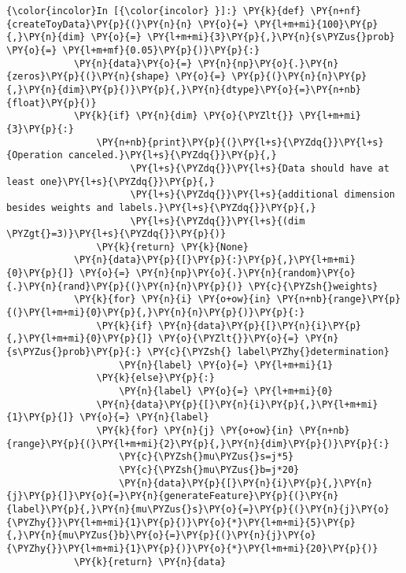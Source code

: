     \begin{Verbatim}[commandchars=\\\{\}]
{\color{incolor}In [{\color{incolor} }]:} \PY{k}{def} \PY{n+nf}{createToyData}\PY{p}{(}\PY{n}{n} \PY{o}{=} \PY{l+m+mi}{100}\PY{p}{,}\PY{n}{dim} \PY{o}{=} \PY{l+m+mi}{3}\PY{p}{,}\PY{n}{s\PYZus{}prob} \PY{o}{=} \PY{l+m+mf}{0.05}\PY{p}{)}\PY{p}{:}
            \PY{n}{data}\PY{o}{=} \PY{n}{np}\PY{o}{.}\PY{n}{zeros}\PY{p}{(}\PY{n}{shape} \PY{o}{=} \PY{p}{(}\PY{n}{n}\PY{p}{,}\PY{n}{dim}\PY{p}{)}\PY{p}{,}\PY{n}{dtype}\PY{o}{=}\PY{n+nb}{float}\PY{p}{)}
            \PY{k}{if} \PY{n}{dim} \PY{o}{\PYZlt{}} \PY{l+m+mi}{3}\PY{p}{:}
                \PY{n+nb}{print}\PY{p}{(}\PY{l+s}{\PYZdq{}}\PY{l+s}{Operation canceled.}\PY{l+s}{\PYZdq{}}\PY{p}{,}
                      \PY{l+s}{\PYZdq{}}\PY{l+s}{Data should have at least one}\PY{l+s}{\PYZdq{}}\PY{p}{,}
                      \PY{l+s}{\PYZdq{}}\PY{l+s}{additional dimension besides weights and labels.}\PY{l+s}{\PYZdq{}}\PY{p}{,}
                      \PY{l+s}{\PYZdq{}}\PY{l+s}{(dim \PYZgt{}=3)}\PY{l+s}{\PYZdq{}}\PY{p}{)}
                \PY{k}{return} \PY{k}{None}
            \PY{n}{data}\PY{p}{[}\PY{p}{:}\PY{p}{,}\PY{l+m+mi}{0}\PY{p}{]} \PY{o}{=} \PY{n}{np}\PY{o}{.}\PY{n}{random}\PY{o}{.}\PY{n}{rand}\PY{p}{(}\PY{n}{n}\PY{p}{)} \PY{c}{\PYZsh{}weights}
            \PY{k}{for} \PY{n}{i} \PY{o+ow}{in} \PY{n+nb}{range}\PY{p}{(}\PY{l+m+mi}{0}\PY{p}{,}\PY{n}{n}\PY{p}{)}\PY{p}{:}
                \PY{k}{if} \PY{n}{data}\PY{p}{[}\PY{n}{i}\PY{p}{,}\PY{l+m+mi}{0}\PY{p}{]} \PY{o}{\PYZlt{}}\PY{o}{=} \PY{n}{s\PYZus{}prob}\PY{p}{:} \PY{c}{\PYZsh{} label\PYZhy{}determination}
                    \PY{n}{label} \PY{o}{=} \PY{l+m+mi}{1}
                \PY{k}{else}\PY{p}{:}
                    \PY{n}{label} \PY{o}{=} \PY{l+m+mi}{0}
                \PY{n}{data}\PY{p}{[}\PY{n}{i}\PY{p}{,}\PY{l+m+mi}{1}\PY{p}{]} \PY{o}{=} \PY{n}{label}
                \PY{k}{for} \PY{n}{j} \PY{o+ow}{in} \PY{n+nb}{range}\PY{p}{(}\PY{l+m+mi}{2}\PY{p}{,}\PY{n}{dim}\PY{p}{)}\PY{p}{:}
                    \PY{c}{\PYZsh{}mu\PYZus{}s=j*5}
                    \PY{c}{\PYZsh{}mu\PYZus{}b=j*20}
                    \PY{n}{data}\PY{p}{[}\PY{n}{i}\PY{p}{,}\PY{n}{j}\PY{p}{]}\PY{o}{=}\PY{n}{generateFeature}\PY{p}{(}\PY{n}{label}\PY{p}{,}\PY{n}{mu\PYZus{}s}\PY{o}{=}\PY{p}{(}\PY{n}{j}\PY{o}{\PYZhy{}}\PY{l+m+mi}{1}\PY{p}{)}\PY{o}{*}\PY{l+m+mi}{5}\PY{p}{,}\PY{n}{mu\PYZus{}b}\PY{o}{=}\PY{p}{(}\PY{n}{j}\PY{o}{\PYZhy{}}\PY{l+m+mi}{1}\PY{p}{)}\PY{o}{*}\PY{l+m+mi}{20}\PY{p}{)}
            \PY{k}{return} \PY{n}{data}
\end{Verbatim}

